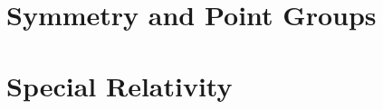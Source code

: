 \documentclass[a4paper, 11pt]{book}
\newcommand{\1}{\opr{\mathds{1}}}
\theoremstyle{definition}
\theoremstyle{remark}
\begin{document}
	\chapter{Symmetry and Point Groups}\label{app:groups}
		
	\chapter{Special Relativity}
		
		
		
\nocite{quantistica,landau3,statistica,struttura,struttura1,griffmq,sakuraimqm,patritesta,molekulphysik,complessa,griffpart,nucleare,relativitat,relativita,pdg,griffpart}
\printbibliography
\end{document}
